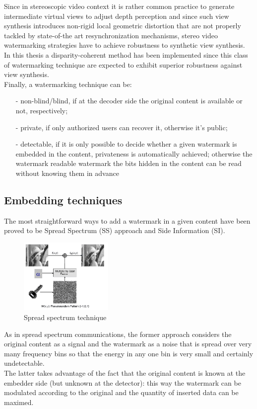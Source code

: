Since in stereoscopic video context it is rather common practice to generate intermediate virtual views to adjust depth perception and since such view synthesis introduces non-rigid local geometric distortion that are not properly tackled by state-of-the art resynchronization mechanisms, stereo video watermarking strategies have to achieve robustness to synthetic view synthesis.\\
In this thesis a disparity-coherent method has been implemented since this class of watermarking technique are expected to exhibit superior robustness against view synthesis.\\

Finally, a watermarking technique can be:
\begin{itemize}
\item[-] non-blind/blind, if at the decoder side the original content is available or not, respectively;
\item[-] private, if only authorized users
can recover it, otherwise it's public;
\item[-] detectable, if it is only possible to decide whether a given watermark is embedded in the content, privateness is automatically achieved; otherwise the watermark readable watermark the bits hidden in the content can be read without
knowing them in advance


\end{itemize}




\subsection{Embedding techniques}
The most straightforward ways to add a watermark in a given content have been proved to be Spread Spectrum (SS) approach and Side Information (SI).\\
\begin{figure}[h!]
\centering
\includegraphics[width=0.4\textwidth]{./img/ss.png}
\caption{\small{Spread spectrum technique}}
\label{fig:ss}
\end{figure}
As in spread spectrum communications, the former approach considers the original
content as a signal and the watermark as a noise that is spread over very many frequency bins so that the energy in any one bin is very small and certainly undetectable.\\
The latter takes advantage of the fact that the original content is known at the
embedder side (but unknown at the detector): this way the watermark can be modulated  according to the original and the quantity of
inserted data can be maximed.\\


